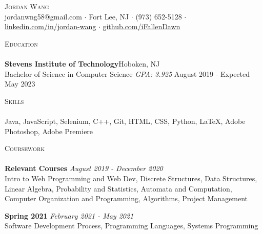 \documentclass[10pt]{article}
\newcommand{\lineunder} {
    \vspace*{-8pt} \\
    \hspace*{-18pt} \hrulefill \\
}
\newcommand{\header} [1] {
    {\hspace*{-18pt}\vspace*{6pt} \textsc{#1}}
    \vspace*{-6pt} \lineunder
}
\begin{document}
\vspace*{-40pt}

    

\vspace*{2pt}
\begin{center}
	{\Huge \scshape {Jordan Wang}}\\
	jordanwng58@gmail.com $\cdot$ Fort Lee, NJ $\cdot$ (973) 652-5128 $\cdot$ \href{https://www.linkedin.com/in/jordan-wang/}{linkedin.com/in/jordan-wang} $\cdot$ \href{https://github.com/iFallenDawn}{github.com/iFallenDawn} \\
\end{center}

\header{Education}
\textbf{Stevens Institute of Technology}\hfill Hoboken, NJ\\
Bachelor of Science in Computer Science \textit{GPA: 3.925} \hfill August 2019 - Expected May 2023\\
\vspace{2mm}

\header{Skills}
	Java, JavaScript, Selenium, C++, Git, HTML, CSS, Python, \LaTeX, Adobe Photoshop, Adobe Premiere                    \\
\vspace{2mm}

\header{Coursework}
{\textbf{Relevant Courses}} {\sl August 2019 - December 2020} \hfill 
\\
Intro to Web Programming and Web Dev, Discrete Structures, Data Structures, Linear Algebra, Probability and Statistics, Automata and Computation, Computer Organization and Programming, Algorithms, Project Management\\
\vspace*{2mm}

{\textbf{Spring 2021}} {\sl February 2021 - May 2021} \hfill 
\\
Software Development Process, Programming Languages, Systems Programming\\
\vspace*{2mm}
\ 
\end{document}
